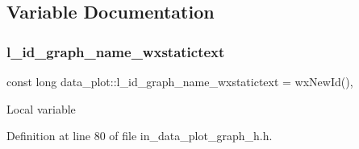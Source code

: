 \subsection{Variable Documentation}
\mbox{\label{group___data__plot_ga91514573294cf8029dcf4e7909614ab0}} 
\subsubsection{l\_id\_graph\_name\_wxstatictext}
{\footnotesize\ttfamily const long data\+\_\+plot\+::l\+\_\+id\+\_\+graph\+\_\+name\+\_\+wxstatictext = wx\+New\+Id()\hspace{0.3cm}{\ttfamily [static]}, {\ttfamily [protected]}}

Local variable 

Definition at line 80 of file in\+\_\+data\+\_\+plot\+\_\+graph\+\_\+h.\+h.

